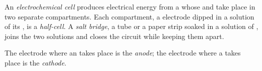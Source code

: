 \begin{definition}\label{def:g12:cells-and-electrolysis:cell}
An \emph{electrochemical cell} produces
electrical energy from a  whose  and  take
place in two separate compartments. Each compartment, a  electrode
dipped in a solution of its , is a
\emph{half-cell}. A \emph{salt bridge},
a tube or a paper strip soaked in a solution of , joins the two
solutions and closes the circuit while keeping them apart.
\end{definition}

\begin{definition}\label{def:g12:cells-and-electrolysis:anode}
The electrode where an  takes place is the
\emph{anode}; the electrode where a  takes place
is the \emph{cathode}.
\end{definition}


